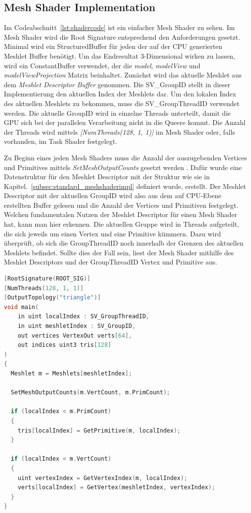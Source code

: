 \subsection{Mesh Shader Implementation}
\label{subsec:mesh_shader_impl}
Im Codeabschnitt~\ref{lst:shadercode} ist ein einfacher Mesh Shader zu sehen.
Im Mesh Shader wird die Root Signature entsprechend den Anforderungen gesetzt.
Minimal wird ein StructuredBuffer für jeden der auf der CPU generierten Meshlet Buffer benötigt.
Um das Endresultat 3-Dimensional wirken zu lassen, wird ein ConstantBuffer verwendet, der die \textit{model}, \textit{modelView} und \textit{modelViewProjection} Matrix beinhaltet.
Zunächst wird das aktuelle Meshlet aus dem \textit{Meshlet Descriptor Buffer} genommen.
Die SV\_GroupID stellt in dieser Implementierung den aktuellen Index der Meshlets dar.
Um den lokalen Index des aktuellen Meshlets zu bekommen, muss die SV\_GroupThreadID verwendet werden.
Die aktuelle GroupID wird in einzelne Threads unterteilt, damit die GPU sich bei der parallelen Verarbeitung nicht in die Queere kommt.
Die Anzahl der Threads wird mittels \textit{[NumThreads(128, 1, 1)]} im Mesh Shader oder, falls vorhanden, im Task Shader festgelegt. \newline

Zu Beginn eines jeden Mesh Shaders muss die Anzahl der auszugebenden Vertices und Primitives mittels \textit{SetMeshOutputCounts} gesetzt werden \cite{Jobalia2019}.
Dafür wurde eine Datenstruktur für den Meshlet Descriptor mit der Struktur wie sie in Kapitel.~\ref{subsec:standard_meshshaderimpl} definiert wurde, erstellt.
Der Meshlet Descriptor mit der aktuellen GroupID wird also aus dem auf CPU-Ebene erstellten Buffer gelesen und die Anzahl der Vertices und Primitiven festgelegt.
Welchen fundamentalen Nutzen der Meshlet Descriptor für einen Mesh Shader hat, kann man hier erkennen.
Die aktuellen Gruppe wird in Threads aufgeteilt, die sich jeweils um einen Vertex und eine Primitive kümmern.
Dazu wird überprüft, ob sich die GroupThreadID noch innerhalb der Grenzen des aktuellen Meshlets befindet.
Sollte dies der Fall sein, liest der Mesh Shader mithilfe des Meshlet Descriptors und der GroupThreadID Vertex und Primitive aus.

\newpage \begin{lstlisting}[language = C++, caption = Standard Mesh Shader main-Methode, label=lst:shadercode]
[RootSignature(ROOT_SIG)]
[NumThreads(128, 1, 1)]
[OutputTopology("triangle")]
void main(
    in uint localIndex : SV_GroupThreadID,
    in uint meshletIndex : SV_GroupID,
    out vertices VertexOut verts[64],
    out indices uint3 tris[128]
)
{
  Meshlet m = Meshlets[meshletIndex];

  SetMeshOutputCounts(m.VertCount, m.PrimCount);
  
  if (localIndex < m.PrimCount)
  {
    tris[localIndex] = GetPrimitive(m, localIndex);
  }
  
  if (localIndex < m.VertCount)
  {
    uint vertexIndex = GetVertexIndex(m, localIndex);
    verts[localIndex] = GetVertex(meshletIndex, vertexIndex);
  }
}
\end{lstlisting}

